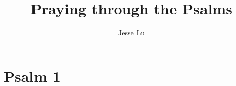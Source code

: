\documentclass[a5paper]{book}
\title{Praying through the Psalms}
\author{Jesse Lu}
\begin{document}
\maketitle
\tableofcontents
\chapter{Psalm 1}
\end{document}
